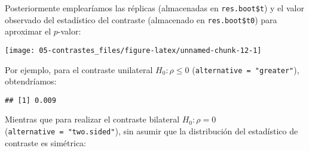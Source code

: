 \documentclass[]{book}
\newenvironment{Shaded}{\begin{snugshade}}{\end{snugshade}}
\newcommand{\KeywordTok}[1]{\textcolor[rgb]{0.13,0.29,0.53}{\textbf{#1}}}
\newcommand{\DataTypeTok}[1]{\textcolor[rgb]{0.13,0.29,0.53}{#1}}
\newcommand{\DecValTok}[1]{\textcolor[rgb]{0.00,0.00,0.81}{#1}}
\newcommand{\StringTok}[1]{\textcolor[rgb]{0.31,0.60,0.02}{#1}}
\newcommand{\OtherTok}[1]{\textcolor[rgb]{0.56,0.35,0.01}{#1}}
\newcommand{\OperatorTok}[1]{\textcolor[rgb]{0.81,0.36,0.00}{\textbf{#1}}}
\newcommand{\NormalTok}[1]{#1}
\theoremstyle{break}
\theoremstyle{definition}
\theoremstyle{definition}
\theoremstyle{definition}
\theoremstyle{remark}
\begin{document}
Posteriormente emplearíamos las réplicas (almacenadas en
\texttt{res.boot\$t}) y el valor observado del estadístico del contraste
(almacenado en \texttt{res.boot\$t0}) para aproximar el \(p\)-valor:

\begin{Shaded}
\end{Shaded}

\begin{center}\texttt{[image: 05-contrastes\_files/figure-latex/unnamed-chunk-12-1]} \end{center}

Por ejemplo, para el contraste unilateral \(H_0: \rho \leq 0\)
(\texttt{alternative\ =\ "greater"}), obtendríamos:

\begin{Shaded}
\end{Shaded}

\begin{verbatim}
## [1] 0.009
\end{verbatim}

Mientras que para realizar el contraste bilateral \(H_0: \rho = 0\)
(\texttt{alternative\ =\ "two.sided"}), sin asumir que la distribución
del estadístico de contraste es simétrica:

\begin{Shaded}
\end{Shaded}
\end{document}
